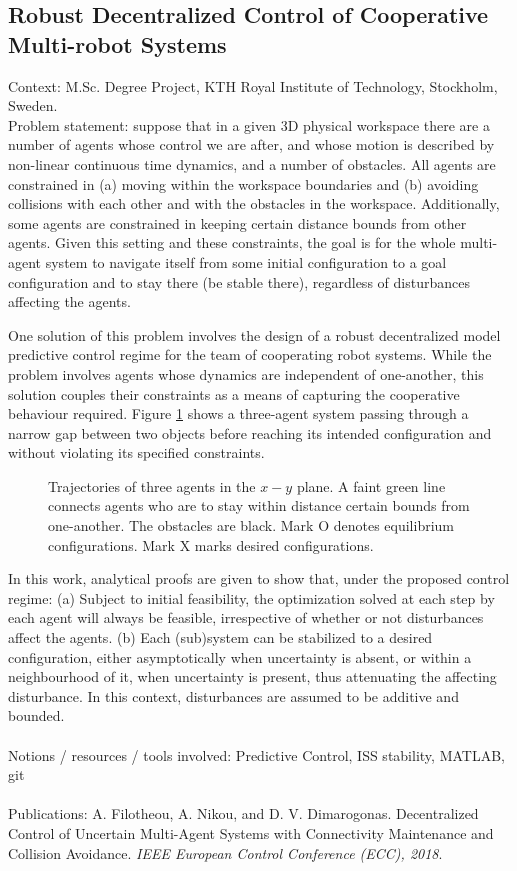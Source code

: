\subsection{Robust Decentralized Control of Cooperative Multi-robot Systems}

Context: M.Sc. Degree Project, KTH Royal Institute of Technology, Stockholm, Sweden.\\

Problem statement: suppose that in a given 3D physical workspace there are
a number of agents whose control we are after, and whose motion is described by
non-linear continuous time dynamics, and a number of obstacles. All agents are
constrained in (a) moving within the workspace boundaries and (b) avoiding
collisions with each other and with the obstacles in the workspace.
Additionally, some agents are constrained in keeping certain distance bounds
from other agents. Given this setting and these constraints, the goal is for the
whole multi-agent system to navigate itself from some initial configuration to
a goal configuration and to stay there (be stable there), regardless of
disturbances affecting the agents.

One solution of this problem involves the design of a robust decentralized model
predictive control regime for the team of cooperating robot systems. While the
problem involves agents whose dynamics are independent of one-another, this solution
couples their constraints as a means of capturing the cooperative behaviour required.
Figure \ref{fig:d_OFF_res_trajectory_3_2} shows a three-agent system passing
through a narrow gap between two objects before reaching its intended
configuration and without violating its specified constraints.

\begin{figure}[H]\centering
  \scalebox{0.8}{}
  \caption{Trajectories of three agents in the $x-y$ plane. A faint green line
    connects agents who are to stay within distance certain bounds from
    one-another. The obstacles are black. Mark O denotes equilibrium
    configurations. Mark X marks desired configurations.}
  \label{fig:d_OFF_res_trajectory_3_2}
\end{figure}

In this work, analytical proofs are given to show that, under the proposed
control regime: (a) Subject to initial feasibility, the optimization solved at
each step by each agent will always be feasible, irrespective of whether or not
disturbances affect the agents. (b) Each (sub)system can be stabilized to a
desired configuration, either asymptotically when uncertainty is absent,
or within a neighbourhood of it, when uncertainty is present, thus attenuating
the affecting disturbance. In this context, disturbances are assumed to be
additive and bounded.\\\\
Notions / resources / tools involved: Predictive Control, ISS stability, MATLAB, git\\\\

Publications: A. Filotheou, A. Nikou, and D. V. Dimarogonas.
Decentralized Control of Uncertain Multi-Agent Systems with Connectivity
Maintenance and Collision Avoidance. \textit{IEEE European Control Conference (ECC), 2018}.
